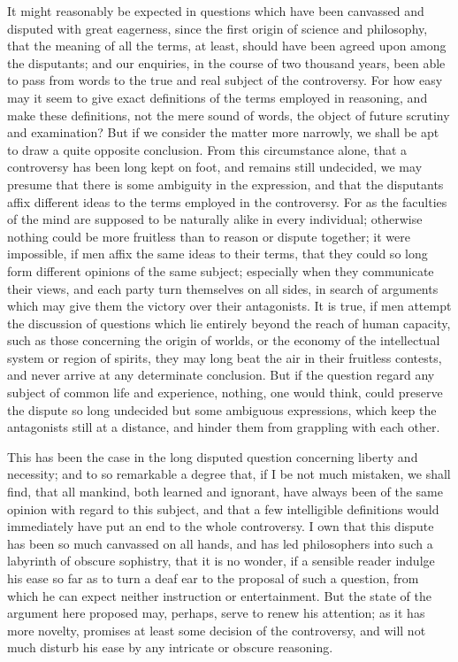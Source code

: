 \documentclass[]{article}
\begin{document}
\begin{sectionbody}

\humeparagraph  It might reasonably be expected in questions which have been canvassed and disputed with great eagerness, since the first origin of science and philosophy, that the meaning of all the terms, at least, should have been agreed upon among the disputants; and our enquiries, in the course of two thousand years, been able to pass from words to the true and real subject of the controversy. For how easy may it seem to give exact definitions of the terms employed in reasoning, and make these definitions, not the mere sound of words, the object of future scrutiny and examination? But if we consider the matter more narrowly, we shall be apt to draw a quite opposite conclusion. From this circumstance alone, that a controversy has been long kept on foot, and remains still undecided, we may presume that there is some ambiguity in the expression, and that the disputants affix different ideas to the terms employed in the controversy. For as the faculties of the mind are supposed to be naturally alike in every individual; otherwise nothing could be more fruitless than to reason or dispute together; it were impossible, if men affix the same ideas to their terms, that they could so long form different opinions of the same subject; especially when they communicate their views, and each party turn themselves on all sides, in search of arguments which may give them the victory over their antagonists. It is true, if men attempt the discussion of questions which lie entirely beyond the reach of human capacity, such as those concerning the origin of worlds, or the economy of the intellectual system or region of spirits, they may long beat the air in their fruitless contests, and never arrive at any determinate conclusion. But if the question regard any subject of common life and experience, nothing, one would think, could preserve the dispute so long undecided but some ambiguous expressions, which keep the antagonists still at a distance, and hinder them from grappling with each other.

\humeparagraph  This has been the case in the long disputed question concerning liberty and necessity; and to so remarkable a degree that, if I be not much mistaken, we shall find, that all mankind, both learned and ignorant, have always been of the same opinion with regard to this subject, and that a few intelligible definitions would immediately have put an end to the whole controversy. I own that this dispute has been so much canvassed on all hands, and has led philosophers into such a labyrinth of obscure sophistry, that it is no wonder, if a sensible reader indulge his ease so far as to turn a deaf ear to the proposal of such a question, from which he can expect neither instruction or entertainment. But the state of the argument here proposed may, perhaps, serve to renew his attention; as it has more novelty, promises at least some decision of the controversy, and will not much disturb his ease by any intricate or obscure reasoning.


\end{sectionbody}
\end{document}
